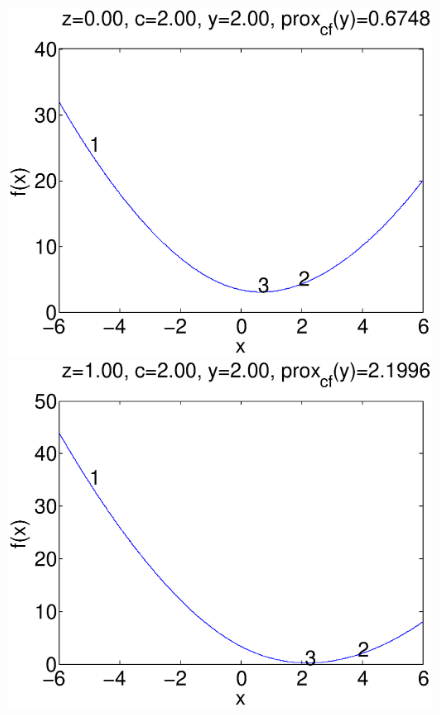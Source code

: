 \documentclass{scrartcl}
\begin{document}
\begin{figure}[H]
  \begin{minipage}[b]{0.3\textwidth}
    \centering
    \includegraphics[scale=0.26]{prob_8_y_2_c_2_z_0.eps}
  \end{minipage}
  \quad
  \begin{minipage}[b]{0.3\textwidth}
    \centering
    \includegraphics[scale=0.26]{prob_8_y_2_c_2_z_1.eps}
  \end{minipage}
  \quad  
  \begin{minipage}[b]{0.3\textwidth}
    \centering

\end{minipage}
\end{figure}
\end{document}
